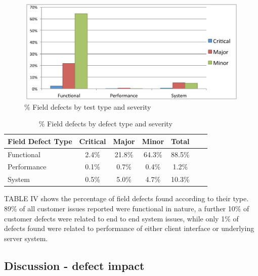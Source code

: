 \begin{figure}
\begin{center}
\includegraphics[height=5cm, width=14cm]{graphs/social_test/graph4.pdf} 
\caption{\% Field defects by test type and severity}
\end{center}
\label{fig:defecttesttype}
\end{figure}

\begin {table}
\caption {}
\caption {\% Field defects by defect type and severity} 
\begin{center}
\begin{tabular}{l*{5}{c}r} Field Defect Type & Critical & Major & Minor &  Total \\ \hline Functional & 2.4\%	 & 21.8\%	& 64.3\%	& 88.5\% \\ Performance & 0.1\% & 0.7\% & 0.4\% & 1.2\% \\ System & 0.5\% & 5.0\% & 4.7\% & 10.3\%   \end{tabular}
\end{center}
\end{table}


TABLE IV shows the percentage of field defects found according to their type. 89\% of all customer issues reported were functional in nature, a further 10\% of customer defects were related to end to end system issues, while only 1\% of defects found were related to performance of either client interface or underlying server system. 


\subsection{Discussion - defect impact}

